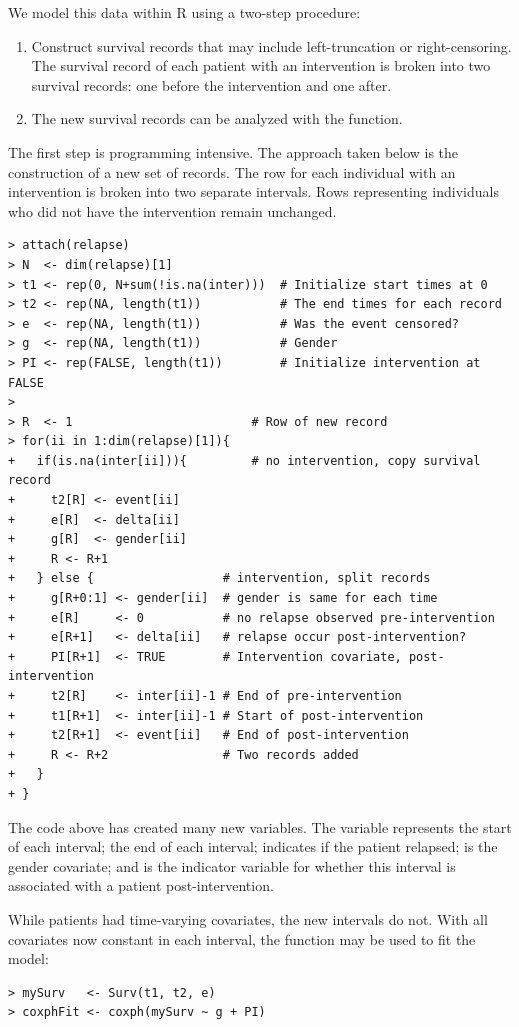 \documentclass[article]{jss}
\begin{document}
We model this data within R using a two-step procedure:
\begin{enumerate}
\item Construct survival records that may include left-truncation or right-censoring. The survival record of each patient with an intervention is broken into two survival records: one before the intervention and one after. %
\item The new survival records can be analyzed with the  function.
\end{enumerate}
The first step is programming intensive. The approach taken below is the construction of a new set of records. The row for each individual with an intervention is broken into two separate intervals. Rows representing individuals who did not have the intervention remain unchanged.
\begin{verbatim}
> attach(relapse)
> N  <- dim(relapse)[1]
> t1 <- rep(0, N+sum(!is.na(inter)))  # Initialize start times at 0
> t2 <- rep(NA, length(t1))           # The end times for each record
> e  <- rep(NA, length(t1))           # Was the event censored?
> g  <- rep(NA, length(t1))           # Gender
> PI <- rep(FALSE, length(t1))        # Initialize intervention at FALSE
> 
> R  <- 1                         # Row of new record
> for(ii in 1:dim(relapse)[1]){
+   if(is.na(inter[ii])){         # no intervention, copy survival record
+     t2[R] <- event[ii]
+     e[R]  <- delta[ii]
+     g[R]  <- gender[ii]
+     R <- R+1
+   } else {                  # intervention, split records
+     g[R+0:1] <- gender[ii]  # gender is same for each time
+     e[R]     <- 0           # no relapse observed pre-intervention
+     e[R+1]   <- delta[ii]   # relapse occur post-intervention?
+     PI[R+1]  <- TRUE        # Intervention covariate, post-intervention
+     t2[R]    <- inter[ii]-1 # End of pre-intervention
+     t1[R+1]  <- inter[ii]-1 # Start of post-intervention
+     t2[R+1]  <- event[ii]   # End of post-intervention
+     R <- R+2                # Two records added
+   }
+ }
\end{verbatim}
The code above has created many new  variables. The  variable represents the start of each interval;  the end of each interval;  indicates if the patient relapsed;  is the gender covariate; and  is the indicator variable for whether this interval is associated with a patient post-intervention.

While patients had time-varying covariates, the new intervals do not. With all covariates now constant in each interval, the  function may be used to fit the model:
\begin{verbatim}
> mySurv   <- Surv(t1, t2, e)
> coxphFit <- coxph(mySurv ~ g + PI)
\end{verbatim}
\end{document}
